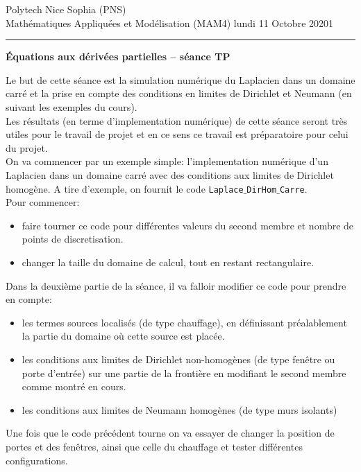 \documentclass[12pt,a4paper]{article}
\begin{document}
 \hfill Polytech Nice Sophia (PNS)\\
\noindent Math\'ematiques Appliqu\'ees et Mod\'elisation (MAM4) \hfill lundi 11 Octobre 20201\\

\hrule

\medskip

\begin{center}{\bf \'Equations aux d\'eriv\'ees partielles -- séance TP}\end{center}

\medskip

\noindent Le but de cette séance est la simulation numérique du Laplacien dans un domaine carré et la prise en compte des conditions en limites de Dirichlet et Neumann (en suivant les exemples du cours). \\

\noindent Les résultats (en terme d'implementation numérique) de cette séance seront très utiles pour le travail de projet et en ce sens ce travail est préparatoire pour celui du projet.\\ 

\noindent On va commencer par un exemple simple: l'implementation numérique d'un Laplacien dans un domaine carré avec des conditions aux limites de Dirichlet homogène. A tire d'exemple, on fournit le code \texttt{Laplace$\_$DirHom$\_$Carre}. \\

\noindent Pour commencer:
\begin{itemize}
\item faire tourner ce code pour différentes valeurs du second membre et nombre de points de discretisation.
\item changer la taille du domaine de calcul, tout en restant rectangulaire.
\end{itemize}

\noindent Dans la deuxième partie de la séance, il va falloir modifier ce code pour prendre en compte:
\begin{itemize}
\item les termes sources localisés (de type chauffage), en définissant préalablement la partie du domaine où cette source est placée.
\item les conditions aux limites de Dirichlet non-homogènes (de type fenêtre ou porte d'entrée) sur une partie de la frontière en modifiant le second membre comme montré en cours. 
\item les conditions aux limites de Neumann homogènes (de type murs isolants)
\end{itemize}
Une fois que le code précédent tourne on va essayer de changer la position de portes et des fenêtres, ainsi que celle du chauffage et tester différentes configurations.\\
\end{document}
